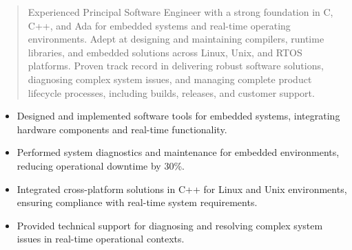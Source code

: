 



\makecvheader

\begin{quote}
  \noindent
  Experienced Principal Software Engineer with a strong foundation in C, C++, and Ada for embedded systems and real-time operating environments. Adept at designing and maintaining compilers, runtime libraries, and embedded solutions across Linux, Unix, and RTOS platforms. Proven track record in delivering robust software solutions, diagnosing complex system issues, and managing complete product lifecycle processes, including builds, releases, and customer support.
\end{quote}

\par\smallskip
\noindent
\begin{minipage}{20cm}
  \begin{minipage}{9.75cm}
    \begin{itemize}
      \item Designed and implemented software tools for embedded systems, integrating hardware components and real-time functionality.
      \item Performed system diagnostics and maintenance for embedded environments, reducing operational downtime by 30\%.
    \end{itemize}
  \end{minipage}
  \hfill
  \begin{minipage}{9.75cm}
    \begin{itemize}
      \item Integrated cross-platform solutions in C++ for Linux and Unix environments, ensuring compliance with real-time system requirements.
      \item Provided technical support for diagnosing and resolving complex system issues in real-time operational contexts.
    \end{itemize}
  \end{minipage}
\end{minipage}
\par\smallskip
\divider

